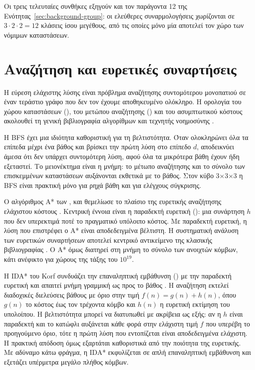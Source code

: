 Οι τρεις τελευταίες συνθήκες εξηγούν και τον παράγοντα 12 της Ενότητας~\ref{sec:background-group}: οι ελεύθερες συναρμολογήσεις χωρίζονται σε \(3\cdot2\cdot2=12\) κλάσεις ίσου μεγέθους, από τις οποίες μόνο μία αποτελεί τον χώρο των νόμιμων καταστάσεων.

\section{Αναζήτηση και ευρετικές συναρτήσεις}
\label{sec:background-search}

Η εύρεση ελάχιστης λύσης είναι πρόβλημα αναζήτησης συντομότερου μονοπατιού σε έναν τεράστιο γράφο που δεν τον έχουμε αποθηκευμένο ολόκληρο. Η ορολογία του χώρου καταστάσεων (), του μετώπου αναζήτησης () και του ασυμπτωτικού κόστους ακολουθεί τη γενική βιβλιογραφία αλγορίθμων και τεχνητής νοημοσύνης \cite{russellNorvig2020aima,cormen2022clrs}.

Η BFS έχει μια ιδιότητα καθοριστική για τη βελτιστότητα. Όταν ολοκληρώνει όλα τα επίπεδα μέχρι ένα βάθος και βρίσκει την πρώτη λύση στο επίπεδο \(d\), αποδεικνύει άμεσα ότι δεν υπάρχει συντομότερη λύση, αφού όλα τα μικρότερα βάθη έχουν ήδη εξεταστεί. Το μειονέκτημα είναι η μνήμη: το μέτωπο αναζήτησης και το σύνολο των επισκεμμένων καταστάσεων αυξάνονται εκθετικά με το βάθος. Στον κύβο 3×3×3 η BFS είναι πρακτική μόνο για ρηχά βάθη και για ελέγχους σύγκρισης.

Ο αλγόριθμος A* των ,  και  θεμελίωσε το πλαίσιο της ευρετικής αναζήτησης ελάχιστου κόστους \cite{hart1968astar}. Κεντρική έννοια είναι η παραδεκτή ευρετική (): μια συνάρτηση \(h\) που δεν υπερεκτιμά ποτέ το πραγματικό υπόλοιπο κόστος. Με παραδεκτή ευρετική, η λύση που επιστρέφει ο A* είναι αποδεδειγμένα βέλτιστη. Η συστηματική ανάλυση των ευρετικών συναρτήσεων αποτελεί κεντρικό αντικείμενο της κλασικής βιβλιογραφίας \cite{pearl1984heuristics}. Ο A* όμως διατηρεί στη μνήμη το σύνολο των ανοιχτών κόμβων, κάτι ανέφικτο για χώρους της τάξης του \(10^{19}\).

Η IDA* του Korf συνδυάζει την επαναληπτική εμβάθυνση () με την παραδεκτή ευρετική και απαιτεί μνήμη γραμμική ως προς το βάθος \cite{korf1985iddfs}. Η αναζήτηση εκτελεί διαδοχικές διελεύσεις βάθους με όριο στην τιμή \(f(n)=g(n)+h(n)\), όπου \(g(n)\) το κόστος έως τον τρέχοντα κόμβο και \(h(n)\) η ευρετική εκτίμηση του υπολοίπου. Η βελτιστότητα μπορεί να διατυπωθεί με ακρίβεια ως εξής: αν η \(h\) είναι παραδεκτή και το κατώφλι αυξάνεται κάθε φορά στην ελάχιστη τιμή \(f\) που υπερέβη το προηγούμενο όριο, τότε η πρώτη λύση που εντοπίζεται είναι αποδεδειγμένα ελάχιστη. Η πρακτική απόδοση όμως εξαρτάται καθοριστικά από την ποιότητα της ευρετικής. Με αδύναμο κάτω φράγμα, η IDA* εκφυλίζεται σε απλή επαναληπτική εμβάθυνση και εξετάζει υπέρμετρα μεγάλο πλήθος κόμβων.

